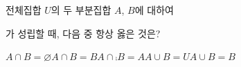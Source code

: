 전체집합 $U$의 두 부분집합 $A$, $B$에 대하여\par\smallskip{}\par\smallskip\noindent 가 성립할 때, 다음 중 항상 옳은 것은?
\begin{choices32}{$A\cap B=\varnothing$}{$A\cap B=B$}{$A\cap\comp{B}=A$}{$A\cup B=U$}{$A\cup B=B$}\end{choices32}
